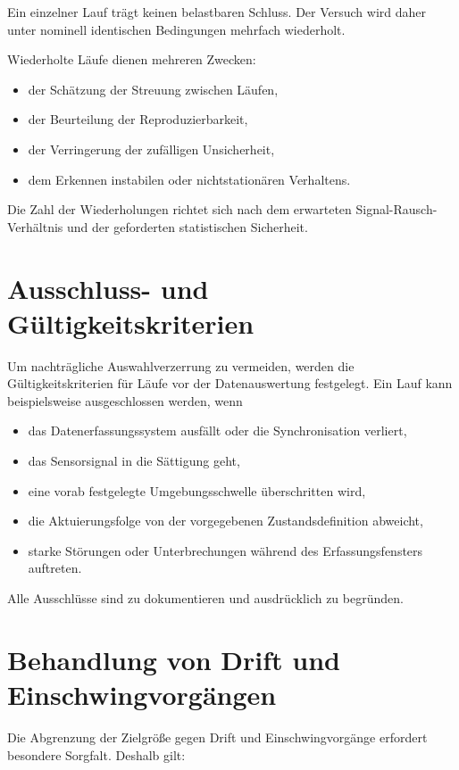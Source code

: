 \documentclass[12pt,a4paper]{report}
\begin{document}
Ein einzelner Lauf trägt keinen belastbaren Schluss. Der Versuch wird
daher unter nominell identischen Bedingungen mehrfach wiederholt.

Wiederholte Läufe dienen mehreren Zwecken:

\begin{itemize}
\item der Schätzung der Streuung zwischen Läufen,
\item der Beurteilung der Reproduzierbarkeit,
\item der Verringerung der zufälligen Unsicherheit,
\item dem Erkennen instabilen oder nichtstationären Verhaltens.
\end{itemize}

Die Zahl der Wiederholungen richtet sich nach dem erwarteten
Signal-Rausch-Verhältnis und der geforderten statistischen Sicherheit.

\section{Ausschluss- und Gültigkeitskriterien}

Um nachträgliche Auswahlverzerrung zu vermeiden, werden die
Gültigkeitskriterien für Läufe vor der Datenauswertung festgelegt. Ein
Lauf kann beispielsweise ausgeschlossen werden, wenn

\begin{itemize}
\item das Datenerfassungssystem ausfällt oder die Synchronisation
      verliert,
\item das Sensorsignal in die Sättigung geht,
\item eine vorab festgelegte Umgebungsschwelle überschritten wird,
\item die Aktuierungsfolge von der vorgegebenen Zustandsdefinition
      abweicht,
\item starke Störungen oder Unterbrechungen während des
      Erfassungsfensters auftreten.
\end{itemize}

Alle Ausschlüsse sind zu dokumentieren und ausdrücklich zu begründen.

\section{Behandlung von Drift und Einschwingvorgängen}

Die Abgrenzung der Zielgröße gegen Drift und Einschwingvorgänge
erfordert besondere Sorgfalt. Deshalb gilt:
\end{document}
